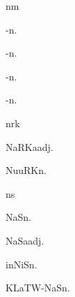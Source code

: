 \begin{multicols*}{2}
\begin{dictroot}{n}{m}
\begin{dictentry}{-}{n.}
    \end{dictentry}
    \begin{dictentry}{-}{n.}
    \end{dictentry}
    \begin{dictentry}{-}{n.}
    \end{dictentry}
    \begin{dictentry}{-}{n.}
    \end{dictentry}
\end{dictroot}

\begin{dictroot}{n}{rk}
    \begin{dictentry}{NaRKa}{adj.}
    \end{dictentry}
    \begin{dictentry}{NuuRK}{n.}
    \end{dictentry}
\end{dictroot}

\begin{dictroot}{n}{s}
    \begin{dictentry}{NaS}{n.}
    \end{dictentry}
    \begin{dictentry}{NaSa}{adj.}
    \end{dictentry}
    \begin{dictentry}{inNiS}{n.}
    \end{dictentry}
    \begin{dictentry}{KLaTW-NaS}{n.}
    \end{dictentry}
\end{dictroot}


\end{multicols*}
